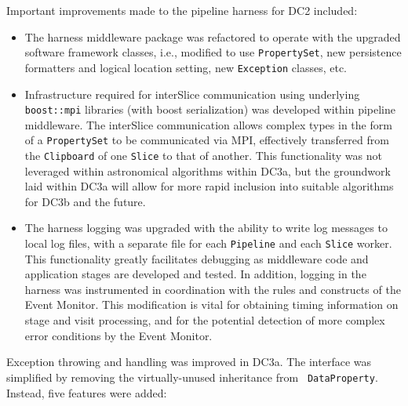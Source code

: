 Important improvements made to the pipeline harness for DC2 included:
\begin{itemize}

\item The harness middleware package was refactored to operate with the upgraded
software framework classes, i.e., modified to use {\tt PropertySet},
new persistence formatters and logical location setting, new {\tt Exception} classes, etc.

\item Infrastructure required for interSlice communication using underlying {\tt boost::mpi}
libraries (with boost serialization) was developed within pipeline middleware.
The interSlice communication allows complex types in the form of a {\tt PropertySet} to be
communicated via MPI, effectively transferred from the {\tt Clipboard} of
one {\tt Slice} to that of another.
This functionality was not leveraged within astronomical algorithms within DC3a, but
the groundwork laid within DC3a will allow for more rapid inclusion into suitable
algorithms for DC3b and the future.

\item The harness logging was upgraded with the ability to write log messages to
local log files, with a separate file for each {\tt Pipeline}
and each {\tt Slice} worker.
This functionality greatly facilitates debugging as middleware code and application
stages are developed and tested.  In addition, logging in the harness
was instrumented in coordination with the rules and constructs of the Event Monitor.
This modification is vital for obtaining timing information on stage and visit processing,
and for the potential detection of more complex error conditions by the Event Monitor.

\end{itemize}



Exception throwing and handling was improved in DC3a. The interface was
simplified by removing the virtually-unused inheritance from {\tt
DataProperty}.  Instead, five features were added:

